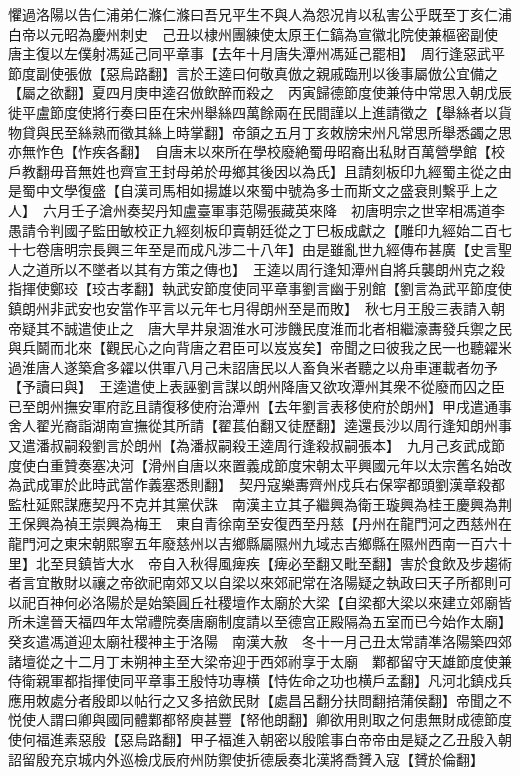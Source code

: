 懼過洛陽以告仁浦弟仁滌仁滌曰吾兄平生不與人為怨况肯以私害公乎既至丁亥仁浦白帝以元昭為慶州刺史　己丑以棣州團練使太原王仁鎬為宣徽北院使兼樞密副使　唐主復以左僕射馮延己同平章事【去年十月唐失潭州馮延己罷相】　周行逢惡武平節度副使張倣【惡烏路翻】言於王逵曰何敬真倣之親戚臨刑以後事屬倣公宜備之【屬之欲翻】夏四月庚申逵召倣飲醉而殺之　丙寅歸德節度使兼侍中常思入朝戊辰徙平盧節度使將行奏曰臣在宋州舉絲四萬餘兩在民間謹以上進請徵之【舉絲者以貨物貸與民至絲熟而徵其絲上時掌翻】帝頷之五月丁亥敇牓宋州凡常思所舉悉蠲之思亦無怍色【怍疾各翻】　自唐末以來所在學校廢絶蜀毋昭裔出私財百萬營學館【校戶教翻毋音無姓也齊宣王封母弟於毋鄉其後因以為氏】且請刻板印九經蜀主從之由是蜀中文學復盛【自漢司馬相如揚雄以來蜀中號為多士而斯文之盛衰則繫乎上之人】　六月壬子滄州奏契丹知盧臺軍事范陽張藏英來降　初唐明宗之世宰相馮道李愚請令判國子監田敏校正九經刻板印賣朝廷從之丁巳板成獻之【雕印九經始二百七十七卷唐明宗長興三年至是而成凡涉二十八年】由是雖亂世九經傳布甚廣【史言聖人之道所以不墜者以其有方策之傳也】　王逵以周行逢知潭州自將兵襲朗州克之殺指揮使鄭珓【珓古孝翻】執武安節度使同平章事劉言幽于别館【劉言為武平節度使鎮朗州非武安也安當作平言以元年七月得朗州至是而敗】　秋七月王殷三表請入朝帝疑其不誠遣使止之　唐大旱井泉涸淮水可涉饑民度淮而北者相繼濠夀發兵禦之民與兵鬬而北來【觀民心之向背唐之君臣可以岌岌矣】帝聞之曰彼我之民一也聽糴米過淮唐人遂築倉多糴以供軍八月己未詔唐民以人畜負米者聽之以舟車運載者勿予【予讀曰與】　王逵遣使上表誣劉言謀以朗州降唐又欲攻潭州其衆不從廢而囚之臣已至朗州撫安軍府訖且請復移使府治潭州【去年劉言表移使府於朗州】甲戌遣通事舍人翟光裔詣湖南宣撫從其所請【翟萇伯翻又徒歷翻】逵還長沙以周行逢知朗州事又遣潘叔嗣殺劉言於朗州【為潘叔嗣殺王逵周行逢殺叔嗣張本】　九月己亥武成節度使白重贊奏塞决河【滑州自唐以來置義成節度宋朝太平興國元年以太宗舊名始改為武成軍於此時武當作義塞悉則翻】　契丹寇樂夀齊州戍兵右保寜都頭劉漢章殺都監杜延熙謀應契丹不克并其黨伏誅　南漢主立其子繼興為衛王璇興為桂王慶興為荆王保興為禎王崇興為梅王　東自青徐南至安復西至丹慈【丹州在龍門河之西慈州在龍門河之東宋朝熙寧五年廢慈州以吉鄉縣屬隰州九域志吉鄉縣在隰州西南一百六十里】北至貝鎮皆大水　帝自入秋得風痺疾【痺必至翻又毗至翻】害於食飲及步趨術者言宜散財以禳之帝欲祀南郊又以自梁以來郊祀常在洛陽疑之執政曰天子所都則可以祀百神何必洛陽於是始築圓丘社稷壇作太廟於大梁【自梁都大梁以來建立郊廟皆所未遑晉天福四年太常禮院奏唐廟制度請以至德宫正殿隔為五室而已今始作太廟】癸亥遣馮道迎太廟社稷神主于洛陽　南漢大赦　冬十一月己丑太常請凖洛陽築四郊諸壇從之十二月丁未朔神主至大梁帝迎于西郊祔享于太廟　鄴都留守天雄節度使兼侍衛親軍都指揮使同平章事王殷恃功專横【恃佐命之功也横戶孟翻】凡河北鎮戍兵應用敇處分者殷即以帖行之又多掊歛民財【處昌呂翻分扶問翻掊蒲侯翻】帝聞之不悦使人謂曰卿與國同體鄴都帑庾甚豐【帑他朗翻】卿欲用則取之何患無財成德節度使何福進素惡殷【惡烏路翻】甲子福進入朝密以殷隂事白帝帝由是疑之乙丑殷入朝詔留殷充京城内外巡檢戊辰府州防禦使折德扆奏北漢將喬贇入寇【贇於倫翻】

